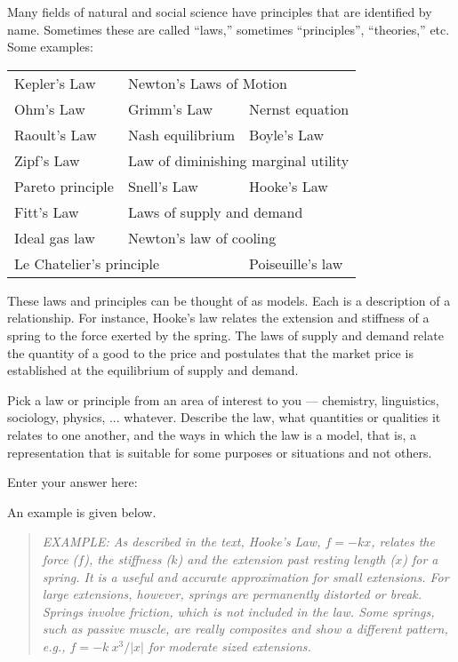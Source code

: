 
Many fields of natural and social science have principles that are
identified by name. Sometimes these are called ``laws,'' sometimes
``principles'', ``theories,'' etc.  Some examples:

\bigskip
\noindent\begin{tabular}{lll}
Kepler's Law & \multicolumn{2}{l}{Newton's Laws of Motion}\\
Ohm's Law & Grimm's Law & Nernst equation\\
Raoult's Law & Nash equilibrium & Boyle's Law\\
Zipf's Law & \multicolumn{2}{l}{Law of diminishing marginal utility} \\
Pareto principle & Snell's Law & Hooke's Law\\
Fitt's Law & \multicolumn{2}{l}{Laws of supply and demand}\\
Ideal gas law & \multicolumn{2}{l}{Newton's law of cooling}\\
\multicolumn{2}{l}{Le Chatelier's principle} & Poiseuille's law\\
\end{tabular}
\bigskip

These laws and principles can be thought of as models.  Each is a
description of a relationship.  For instance, Hooke's law relates the
extension and stiffness of a spring to the force exerted by the
spring.  The laws of supply and demand relate the quantity of a good
to the price and postulates that the market price is established at
the equilibrium of supply and demand.

Pick a law or principle from an area of interest to you --- chemistry,
linguistics, sociology, physics, ... whatever.  Describe the law, what
quantities or qualities it relates to one another, and the ways in
which the law is a model, that is, a representation that is suitable
for some purposes or situations and not others.

Enter your answer here: \TextEntry  

An example is given below.


\begin{quotation}
\em
EXAMPLE: As described in the text, Hooke's Law, $f = -k x$, relates the
force ($f$), the stiffness ($k$) and the extension past resting length ($x$)
for a spring.  It is a useful and accurate approximation for small
extensions.  For large extensions, however, springs are permanently
distorted or break.  Springs involve friction, which is not included
in the law.  Some springs, such as passive muscle, are really
composites and show a different pattern, e.g., $f = -  k \ {x^3} / {|x|}$ for
moderate sized extensions.
\end{quotation}


